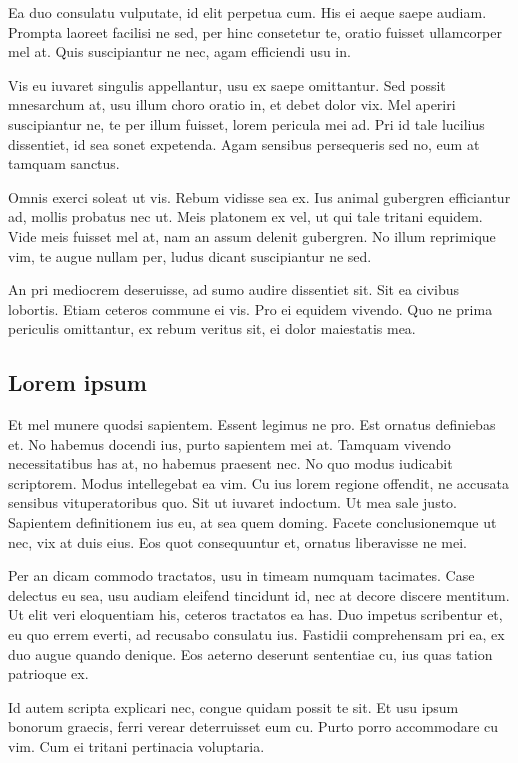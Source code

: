 Ea duo consulatu vulputate, id elit perpetua cum. His ei aeque saepe audiam. Prompta laoreet facilisi ne sed, per hinc consetetur te, oratio fuisset ullamcorper mel at. Quis suscipiantur ne nec, agam efficiendi usu in.

Vis eu iuvaret singulis appellantur, usu ex saepe omittantur. Sed possit mnesarchum at, usu illum choro oratio in, et debet dolor vix. Mel aperiri suscipiantur ne, te per illum fuisset, lorem pericula mei ad. Pri id tale lucilius dissentiet, id sea sonet expetenda. Agam sensibus persequeris sed no, eum at tamquam sanctus.

Omnis exerci soleat ut vis. Rebum vidisse sea ex. Ius animal gubergren efficiantur ad, mollis probatus nec ut. Meis platonem ex vel, ut qui tale tritani equidem. Vide meis fuisset mel at, nam an assum delenit gubergren. No illum reprimique vim, te augue nullam per, ludus dicant suscipiantur ne sed.

An pri mediocrem deseruisse, ad sumo audire dissentiet sit. Sit ea civibus lobortis. Etiam ceteros commune ei vis. Pro ei equidem vivendo. Quo ne prima periculis omittantur, ex rebum veritus sit, ei dolor maiestatis mea.

\subsection{Lorem ipsum}

Et mel munere quodsi sapientem. Essent legimus ne pro. Est ornatus definiebas et. No habemus docendi ius, purto sapientem mei at. Tamquam vivendo necessitatibus has at, no habemus praesent nec. No quo modus iudicabit scriptorem. Modus intellegebat ea vim. Cu ius lorem regione offendit, ne accusata sensibus vituperatoribus quo. Sit ut iuvaret indoctum. Ut mea sale justo. Sapientem definitionem ius eu, at sea quem doming. Facete conclusionemque ut nec, vix at duis eius. Eos quot consequuntur et, ornatus liberavisse ne mei.

Per an dicam commodo tractatos, usu in timeam numquam tacimates. Case delectus eu sea, usu audiam eleifend tincidunt id, nec at decore discere mentitum. Ut elit veri eloquentiam his, ceteros tractatos ea has. Duo impetus scribentur et, eu quo errem everti, ad recusabo consulatu ius. Fastidii comprehensam pri ea, ex duo augue quando denique. Eos aeterno deserunt sententiae cu, ius quas tation patrioque ex.

Id autem scripta explicari nec, congue quidam possit te sit. Et usu ipsum bonorum graecis, ferri verear deterruisset eum cu. Purto porro accommodare cu vim. Cum ei tritani pertinacia voluptaria.